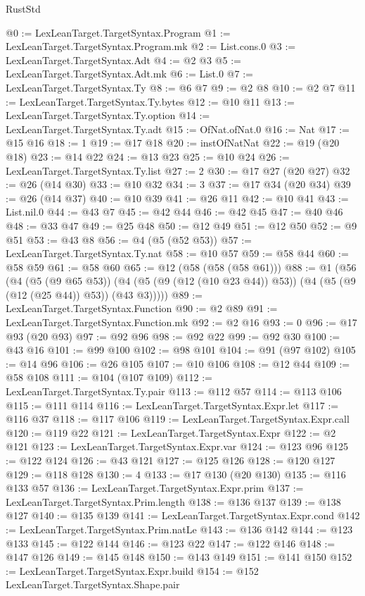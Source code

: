 \begin{lexlean}{RustStd}
\begin{coremodule}
{\begin{coremodule}
{{{{{{{{{{{{{{{{{{{{{{{{{{{{{{{{{{{{{{{{{{{{{{{{{{{{{{{{{{{{{{{{{{{{@0 := LexLeanTarget.TargetSyntax.Program
@1 := LexLeanTarget.TargetSyntax.Program.mk
@2 := List.cons.{0}
@3 := LexLeanTarget.TargetSyntax.Adt
@4 := @2 @3
@5 := LexLeanTarget.TargetSyntax.Adt.mk
@6 := List.{0}
@7 := LexLeanTarget.TargetSyntax.Ty
@8 := @6 @7
@9 := @2 @8
@10 := @2 @7
@11 := LexLeanTarget.TargetSyntax.Ty.bytes
@12 := @10 @11
@13 := LexLeanTarget.TargetSyntax.Ty.option
@14 := LexLeanTarget.TargetSyntax.Ty.adt
@15 := OfNat.ofNat.{0}
@16 := Nat
@17 := @15 @16
@18 := 1
@19 := @17 @18
@20 := instOfNatNat
@22 := @19 (@20 @18)
@23 := @14 @22
@24 := @13 @23
@25 := @10 @24
@26 := LexLeanTarget.TargetSyntax.Ty.list
@27 := 2
@30 := @17 @27 (@20 @27)
@32 := @26 (@14 @30)
@33 := @10 @32
@34 := 3
@37 := @17 @34 (@20 @34)
@39 := @26 (@14 @37)
@40 := @10 @39
@41 := @26 @11
@42 := @10 @41
@43 := List.nil.{0}
@44 := @43 @7
@45 := @42 @44
@46 := @42 @45
@47 := @40 @46
@48 := @33 @47
@49 := @25 @48
@50 := @12 @49
@51 := @12 @50
@52 := @9 @51
@53 := @43 @8
@56 := @4 (@5 (@52 @53))
@57 := LexLeanTarget.TargetSyntax.Ty.nat
@58 := @10 @57
@59 := @58 @44
@60 := @58 @59
@61 := @58 @60
@65 := @12 (@58 (@58 (@58 @61)))
@88 := @1
    (@56
      (@4
        (@5 (@9 @65 @53))
        (@4 (@5 (@9 (@12 (@10 @23 @44)) @53)) (@4 (@5 (@9 (@12 (@25 @44)) @53)) (@43 @3)))))
@89 := LexLeanTarget.TargetSyntax.Function
@90 := @2 @89
@91 := LexLeanTarget.TargetSyntax.Function.mk
@92 := @2 @16
@93 := 0
@96 := @17 @93 (@20 @93)
@97 := @92 @96
@98 := @92 @22
@99 := @92 @30
@100 := @43 @16
@101 := @99 @100
@102 := @98 @101
@104 := @91 (@97 @102)
@105 := @14 @96
@106 := @26 @105
@107 := @10 @106
@108 := @12 @44
@109 := @58 @108
@111 := @104 (@107 @109)
@112 := LexLeanTarget.TargetSyntax.Ty.pair
@113 := @112 @57
@114 := @113 @106
@115 := @111 @114
@116 := LexLeanTarget.TargetSyntax.Expr.let
@117 := @116 @37
@118 := @117 @106
@119 := LexLeanTarget.TargetSyntax.Expr.call
@120 := @119 @22
@121 := LexLeanTarget.TargetSyntax.Expr
@122 := @2 @121
@123 := LexLeanTarget.TargetSyntax.Expr.var
@124 := @123 @96
@125 := @122 @124
@126 := @43 @121
@127 := @125 @126
@128 := @120 @127
@129 := @118 @128
@130 := 4
@133 := @17 @130 (@20 @130)
@135 := @116 @133 @57
@136 := LexLeanTarget.TargetSyntax.Expr.prim
@137 := LexLeanTarget.TargetSyntax.Prim.length
@138 := @136 @137
@139 := @138 @127
@140 := @135 @139
@141 := LexLeanTarget.TargetSyntax.Expr.cond
@142 := LexLeanTarget.TargetSyntax.Prim.natLe
@143 := @136 @142
@144 := @123 @133
@145 := @122 @144
@146 := @123 @22
@147 := @122 @146
@148 := @147 @126
@149 := @145 @148
@150 := @143 @149
@151 := @141 @150
@152 := LexLeanTarget.TargetSyntax.Expr.build
@154 := @152 LexLeanTarget.TargetSyntax.Shape.pair
}}}}}}}}}}}}}}}}}}}}}}}}}}}}}}}}}}}}}}}}}}}}}}}}}}}}}}}}}}}}}}}}}}}}
\end{coremodule}}
\end{coremodule}
\end{lexlean}
